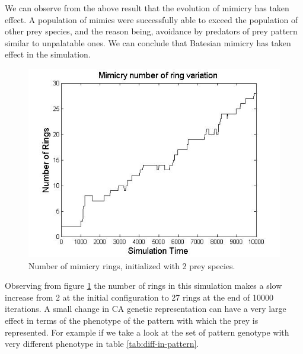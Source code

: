 We can observe from the above result that the evolution of mimicry has taken effect. A population of mimics were successfully able to exceed the population of other prey species, and the reason being, avoidance by predators of prey pattern similar to unpalatable ones. We can conclude that Batesian mimicry has taken effect in the simulation.

\begin{figure}[H]
	\centering
	\includegraphics[scale=0.50]{images/ringSize10k-2Prey}
	\caption[Number of mimicry rings (2 prey species)]{Number of mimicry rings, initialized with 2 prey species.}
	\label{fig:ringSize10k-2Prey}
\end{figure}

Observing from figure \ref{fig:ringSize10k-2Prey} the number of rings in this simulation makes a slow increase from 2 at the initial configuration to 27 rings at the end of 10000 iterations. A small change in CA genetic representation can have a very large effect in terms of the phenotype of the pattern with which the prey is represented. For example if we take a look at the set of pattern genotype with very different phenotype in table \ref{tab:diff-in-pattern}.

